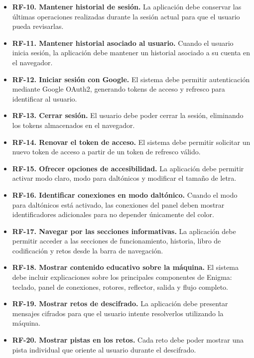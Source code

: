 \begin{itemize}
    \item \textbf{RF-10. Mantener historial de sesión.} La aplicación debe conservar las últimas operaciones realizadas durante la sesión actual para que el usuario pueda revisarlas.

    \item \textbf{RF-11. Mantener historial asociado al usuario.} Cuando el usuario inicia sesión, la aplicación debe mantener un historial asociado a su cuenta en el navegador.

    \item \textbf{RF-12. Iniciar sesión con Google.} El sistema debe permitir autenticación mediante Google OAuth2, generando tokens de acceso y refresco para identificar al usuario.

    \item \textbf{RF-13. Cerrar sesión.} El usuario debe poder cerrar la sesión, eliminando los tokens almacenados en el navegador.

    \item \textbf{RF-14. Renovar el token de acceso.} El sistema debe permitir solicitar un nuevo token de acceso a partir de un token de refresco válido.

    \item \textbf{RF-15. Ofrecer opciones de accesibilidad.} La aplicación debe permitir activar modo claro, modo para daltónicos y modificar el tamaño de letra.

    \item \textbf{RF-16. Identificar conexiones en modo daltónico.} Cuando el modo para daltónicos está activado, las conexiones del panel deben mostrar identificadores adicionales para no depender únicamente del color.

    \item \textbf{RF-17. Navegar por las secciones informativas.} La aplicación debe permitir acceder a las secciones de funcionamiento, historia, libro de codificación y retos desde la barra de navegación.

    \item \textbf{RF-18. Mostrar contenido educativo sobre la máquina.} El sistema debe incluir explicaciones sobre los principales componentes de Enigma: teclado, panel de conexiones, rotores, reflector, salida y flujo completo.

    \item \textbf{RF-19. Mostrar retos de descifrado.} La aplicación debe presentar mensajes cifrados para que el usuario intente resolverlos utilizando la máquina.

    \item \textbf{RF-20. Mostrar pistas en los retos.} Cada reto debe poder mostrar una pista individual que oriente al usuario durante el descifrado.
\end{itemize}

